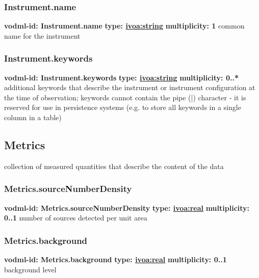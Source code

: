     \subsubsection{Instrument.name}
      \textbf{vodml-id: Instrument.name} \newline
      \textbf{type: \hyperref[sect:ivoa]{ivoa:string}} \newline
      \textbf{multiplicity: 1} \newline
      common name for the instrument

    \subsubsection{Instrument.keywords}
      \textbf{vodml-id: Instrument.keywords} \newline
      \textbf{type: \hyperref[sect:ivoa]{ivoa:string}} \newline
      \textbf{multiplicity: 0..*} \newline
      additional keywords that describe the instrument or instrument configuration at the time of observation; keywords cannot contain the pipe (|) character - it is reserved for use in persistence systems (e.g. to store all keywords in a single column in a table)

  \subsection{Metrics}
  \label{sect:Metrics}
    collection of measured quantities that describe the content of the data

    \subsubsection{Metrics.sourceNumberDensity}
      \textbf{vodml-id: Metrics.sourceNumberDensity} \newline
      \textbf{type: \hyperref[sect:ivoa]{ivoa:real}} \newline
      \textbf{multiplicity: 0..1} \newline
      number of sources detected per unit area

    \subsubsection{Metrics.background}
      \textbf{vodml-id: Metrics.background} \newline
      \textbf{type: \hyperref[sect:ivoa]{ivoa:real}} \newline
      \textbf{multiplicity: 0..1} \newline
      background level

